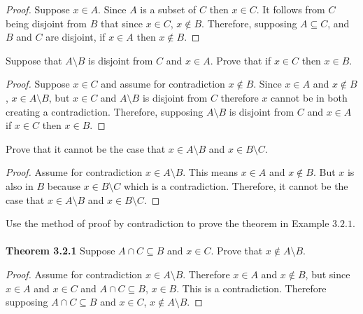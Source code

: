 \begin{proof}
    Suppose $x \in A$. Since $A$ is a subset of $C$ then $x \in C$. It follows from
    $C$ being disjoint from $B$ that since $x \in C$, $x \not \in B$. Therefore, 
    supposing $A \subseteq C$, and $B$ and $C$ are disjoint, if $x \in A$ then $x \not\in B$.
\end{proof}

\begin{tcolorbox}[title=Problem 4, breakable]
    Suppose that $A \setminus B$ is disjoint from $C$ and $x \in A$.
    Prove that if $x \in C$ then $x \in B$.
\end{tcolorbox}

\begin{proof}
    Suppose $x \in C$ and assume for contradiction $x \not \in B$.
    Since $x \in A$ and $x \not \in B$, $x \in A \setminus B$, but
    $x \in C$ and $A \setminus B$ is disjoint from $C$ therefore $x$
    cannot be in both creating a contradiction. Therefore, 
    supposing $A \setminus B$ is disjoint from $C$ and $x \in A$ if $x \in C$ then $x \in B$.
\end{proof}

\begin{tcolorbox}[title=Problem 5, breakable]
    Prove that it cannot be the case that $x \in A \setminus B$ and $x
        \in B \setminus C$.
\end{tcolorbox}

\begin{proof}
    Assume for contradiction $x \in A \setminus B$. This means $x \in A$ and $x \not \in B$.
    But $x$ is also in $B$ because $x \in B \setminus C$ which is a contradiction. Therefore,
    it cannot be the case that $x \in A \setminus B$ and $x\in B \setminus C$.
\end{proof}

\begin{tcolorbox}[title=Problem 6, breakable]
    Use the method of proof by contradiction to prove
    the theorem in Example $3.2.1$. \\ \\
    \textbf{Theorem 3.2.1} Suppose $A \cap C \subseteq B$ and $x \in C$.
    Prove that $x \not \in A \setminus B$.
\end{tcolorbox}

\begin{proof}
    Assume for contradiction $x \in A \setminus B$. 
    Therefore $x \in A$ and $x \not \in B$, but since 
    $x \in A$ and $x \in C$ and $A \cap C \subseteq B$, $x \in B$. This is a contradiction.
    Therefore supposing $A \cap C \subseteq B$ and $x \in C$, $x \not \in A \setminus B$.
\end{proof}

